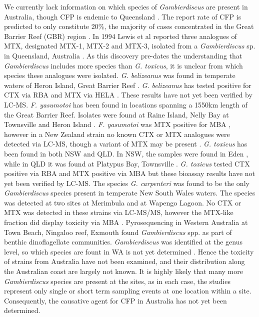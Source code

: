 \documentclass[12pt]{article}
\begin{document}
We currently lack information on which species of \emph{Gambierdiscus} are present in Australia, though CFP is endemic to Queensland \cite{lewis2006ciguatera}. The report rate of CFP is predicted to only constitute 20\%, the majority of cases concentrated in the Great Barrier Reef (GBR) region \cite{lewis2006ciguatera}.
In 1994 Lewis et al reported three analogues of MTX, designated MTX-1, MTX-2 and MTX-3, isolated from a \emph{Gambierdiscus} sp. in Queensland, Australia \cite{holmes1994purification}. As this discovery pre-dates the understanding that \emph{Gambierdiscus} includes more species than \emph{G. toxicus}, it is unclear from which species these analogues were isolated.  
\emph{G. belizeanus} was found in temperate waters of Heron Island, Great Barrier Reef  \cite{murray2014molecular}. \emph{G. belizeanus} has tested positive for CTX via RBA \cite{chinain2010growth} and MTX via HELA \cite{holland2013differences}. These results have not yet been verified by LC-MS.
\emph{F. yasumotoi} has been found in locations spanning a 1550km length of the Great Barrier Reef. Isolates were found at Raine Island, Nelly Bay at Townsville and Heron Island \cite{murray2014molecular}. \emph{F. yasumotoi} was MTX positive for MBA \cite{holmes1998gambierdiscus}, however in a New Zealand strain no known CTX or MTX analogues were detected via LC-MS, though a variant of MTX may be present \cite{rhodes2014gambierdiscus}.
\emph{G. toxicus} has been found in both NSW and QLD. In NSW, the samples were found in Eden \cite{hallegraeff2010algae}, while in QLD it was found at Platypus Bay, Townsville  \cite{hallegraeff2010algae}. \emph{G. toxicus} tested CTX positive via RBA \cite{chinain2010growth} and MTX positive via MBA \cite{chinain1999morphology} but these bioassay results have not yet been verified by LC-MS.
The species \emph{G. carpenteri} was found to be the only \emph{Gambierdiscus} species present in temperate New South Wales waters. The species was detected at two sites at Merimbula and at Wapengo Lagoon. No CTX or MTX was detected in these strains via LC-MS/MS, however the MTX-like fraction did display toxicity via MBA  \cite{kohli2014high}. 
Pyrosequencing in Western Australia at Town Beach, Ningaloo reef, Exmouth found \emph{Gambierdiscus} spp. as part of benthic dinoflagellate communities.  \emph{Gambierdiscus} was identified at the genus level, so which species are fount in WA is not yet determined \cite{kohli2014cob}. 
Hence the toxicity of strains from Australia have not been examined, and their distribution along the Australian coast are largely not known. It is highly likely that many more \emph{Gambierdiscus} species are present at the sites, as in each case, the studies represent only single or short term sampling events at one location within a site. Consequently, the causative agent for CFP in Australia has not yet been determined. \\
\end{document}

